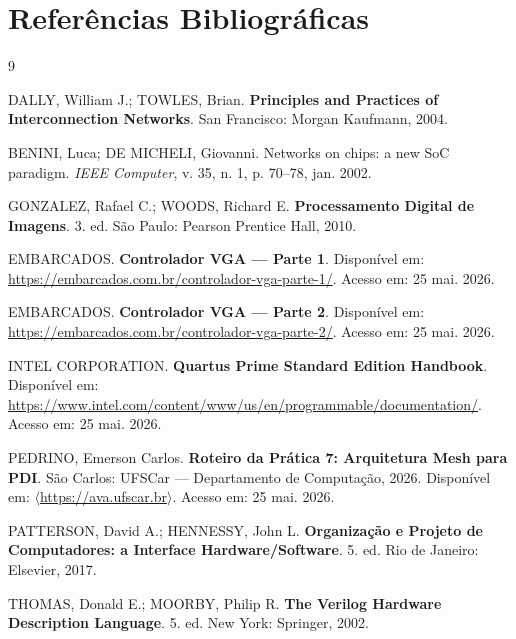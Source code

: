\documentclass[12pt, a4paper]{article}
\begin{document}
	\section{Referências Bibliográficas}
	
	\begin{thebibliography}{9}
		
		DALLY, William J.; TOWLES, Brian.
		\textbf{Principles and Practices of Interconnection Networks}.
		San Francisco: Morgan Kaufmann, 2004.
		
		BENINI, Luca; DE MICHELI, Giovanni.
		Networks on chips: a new SoC paradigm.
		\textit{IEEE Computer}, v. 35, n. 1, p. 70--78, jan. 2002.
		
		GONZALEZ, Rafael C.; WOODS, Richard E.
		\textbf{Processamento Digital de Imagens}.
		3. ed. São Paulo: Pearson Prentice Hall, 2010.
		
		EMBARCADOS.
		\textbf{Controlador VGA --- Parte 1}.
		Disponível em: \url{https://embarcados.com.br/controlador-vga-parte-1/}.
		Acesso em: 25 mai. 2026.
		
		EMBARCADOS.
		\textbf{Controlador VGA --- Parte 2}.
		Disponível em: \url{https://embarcados.com.br/controlador-vga-parte-2/}.
		Acesso em: 25 mai. 2026.
		
		INTEL CORPORATION.
		\textbf{Quartus Prime Standard Edition Handbook}.
		Disponível em: \url{https://www.intel.com/content/www/us/en/programmable/documentation/}.
		Acesso em: 25 mai. 2026.
		
		PEDRINO, Emerson Carlos.
		\textbf{Roteiro da Prática 7: Arquitetura Mesh para PDI}.
		São Carlos: UFSCar --- Departamento de Computação, 2026.
		Disponível em: $\langle$\url{https://ava.ufscar.br}$\rangle$. Acesso em: 25 mai. 2026.
		
		PATTERSON, David A.; HENNESSY, John L.
		\textbf{Organização e Projeto de Computadores: a Interface Hardware/Software}.
		5. ed. Rio de Janeiro: Elsevier, 2017.
		
		THOMAS, Donald E.; MOORBY, Philip R.
		\textbf{The Verilog Hardware Description Language}.
		5. ed. New York: Springer, 2002.
		
	\end{thebibliography}
	
	
\end{document}
